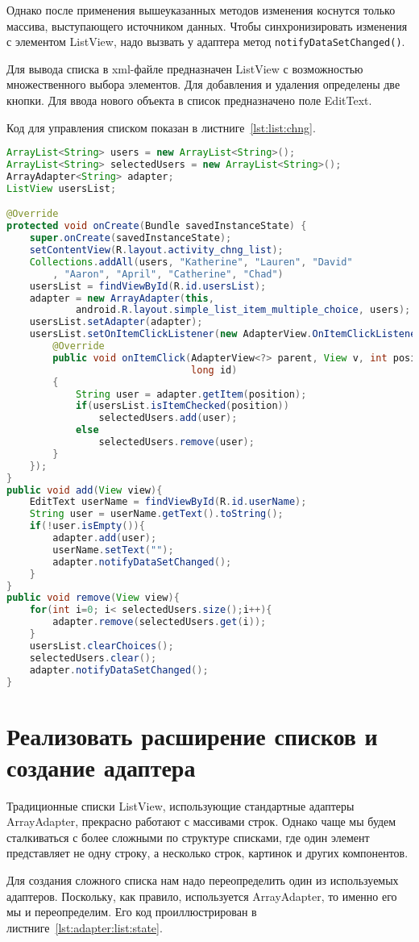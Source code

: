 Однако после применения вышеуказанных методов изменения коснутся
только массива, выступающего источником данных. Чтобы
синхронизировать изменения с элементом ListView, надо вызвать у адаптера
метод \texttt{notifyDataSetChanged()}.\par
Для вывода списка в xml-файле предназначен ListView с возможностью
множественного выбора элементов. Для добавления и удаления определены
две кнопки. Для ввода нового объекта в список предназначено поле EditText.\par
Код для управления списком показан в листниге~\ref{lst:list:chng}.

\begin{lstlisting}[language=Java
	, label=lst:list:chng
	]
ArrayList<String> users = new ArrayList<String>();
ArrayList<String> selectedUsers = new ArrayList<String>();
ArrayAdapter<String> adapter;
ListView usersList;

@Override
protected void onCreate(Bundle savedInstanceState) {
	super.onCreate(savedInstanceState);
	setContentView(R.layout.activity_chng_list);
	Collections.addAll(users, "Katherine", "Lauren", "David"
		, "Aaron", "April", "Catherine", "Chad")
	usersList = findViewById(R.id.usersList);
	adapter = new ArrayAdapter(this,
			android.R.layout.simple_list_item_multiple_choice, users);
	usersList.setAdapter(adapter);
	usersList.setOnItemClickListener(new AdapterView.OnItemClickListener(){
		@Override
		public void onItemClick(AdapterView<?> parent, View v, int position,
								long id)
		{
			String user = adapter.getItem(position);
			if(usersList.isItemChecked(position))
				selectedUsers.add(user);
			else
				selectedUsers.remove(user);
		}
	});
}
public void add(View view){
	EditText userName = findViewById(R.id.userName);
	String user = userName.getText().toString();
	if(!user.isEmpty()){
		adapter.add(user);
		userName.setText("");
		adapter.notifyDataSetChanged();
	}
}
public void remove(View view){
	for(int i=0; i< selectedUsers.size();i++){
		adapter.remove(selectedUsers.get(i));
	}
	usersList.clearChoices();
	selectedUsers.clear();
	adapter.notifyDataSetChanged();
}
\end{lstlisting}

\section{Реализовать расширение списков и создание адаптера}
Традиционные списки ListView, использующие стандартные адаптеры
ArrayAdapter, прекрасно работают с массивами строк. Однако чаще мы будем
сталкиваться с более сложными по структуре списками, где один элемент
представляет не одну строку, а несколько строк, картинок и других
компонентов.\par
Для создания сложного списка нам надо переопределить один из
используемых адаптеров. Поскольку, как правило, используется
ArrayAdapter, то именно его мы и переопределим.
Его код проиллюстрирован в листниге~\ref{lst:adapter:list:state}.

